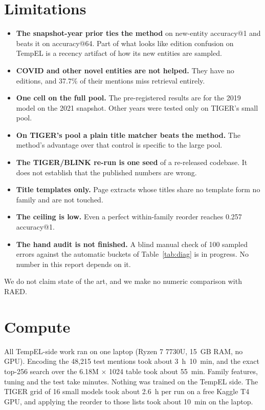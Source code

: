 \documentclass[conference]{IEEEtran}
\begin{document}
\section{Limitations}

\begin{itemize}
\item \textbf{The snapshot-year prior ties the method} on new-entity accuracy@1 and beats it on
accuracy@64. Part of what looks like edition confusion on TempEL is a recency artifact of how its new
entities are sampled.
\item \textbf{COVID and other novel entities are not helped.} They have no editions, and 37.7\% of
their mentions miss retrieval entirely.
\item \textbf{One cell on the full pool.} The pre-registered results are for the 2019 model on the
2021 snapshot. Other years were tested only on TIGER's small pool.
\item \textbf{On TIGER's pool a plain title matcher beats the method.} The method's advantage over
that control is specific to the large pool.
\item \textbf{The TIGER/BLINK re-run is one seed} of a re-released codebase. It does not establish
that the published numbers are wrong.
\item \textbf{Title templates only.} Page extracts whose titles share no template form no family and
are not touched.
\item \textbf{The ceiling is low.} Even a perfect within-family reorder reaches 0.257 accuracy@1.
\item \textbf{The hand audit is not finished.} A blind manual check of 100 sampled errors against the
automatic buckets of Table~\ref{tab:diag} is in progress. No number in this report depends on it.
\end{itemize}

We do not claim state of the art, and we make no numeric comparison with RAED.

\section{Compute}

All TempEL-side work ran on one laptop (Ryzen 7 7730U, 15~GB RAM, no GPU). Encoding the 48,215 test
mentions took about 3~h~10~min, and the exact top-256 search over the 6.18M $\times$ 1024 table took
about 55~min. Family features, tuning and the test take minutes. Nothing was trained on the TempEL
side. The TIGER grid of 16 small models took about 2.6~h per run on a free Kaggle T4 GPU, and applying
the reorder to those lists took about 10~min on the laptop.
\end{document}
